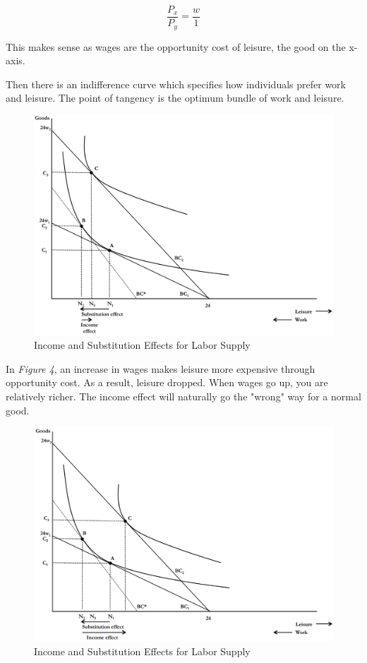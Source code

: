 \documentclass{article}
\begin{document}
$$\frac{P_{x}}{P_{y}}=\frac{w}{1}$$

This makes sense as wages are the opportunity cost of leisure, the good on the
x-axis.

Then there is an indifference curve which specifies how individuals prefer work
and leisure. The point of tangency is the optimum bundle of work and leisure.

\begin{figure}[H]
    \centering
    \includegraphics[scale=0.33]{"Figure 16-4"}
    \caption{Income and Substitution Effects for Labor Supply}
\end{figure}

In \textit{Figure 4}, an increase in wages makes leisure more expensive through
opportunity cost. As a result, leisure dropped. When wages go up, you are
relatively richer. The income effect will naturally go the "wrong" way for a
normal good.

\begin{figure}
    \centering
    \includegraphics[scale=0.33]{"Figure 16-5"}
    \caption{Income and Substitution Effects for Labor Supply}
\end{figure}
\end{document}
